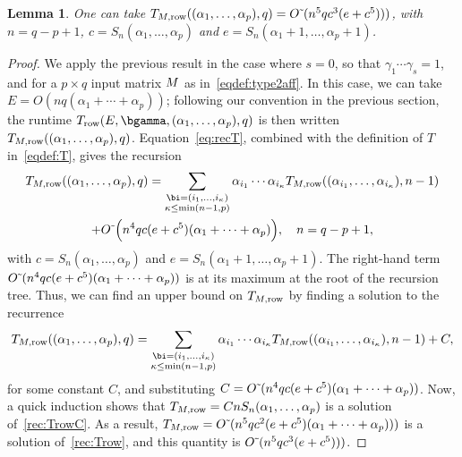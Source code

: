 \documentclass[12pt]{article}
\newtheorem{lemma}[definition]{Lemma}
\begin{document}
\begin{lemma}
  One can take $T_{M,{\rm row}}((\alpha_1,\dots,\alpha_p),q)= {O}{\,\tilde{ }\,}( n^5 q c^3(e+c^5 )))$, with
  $n=q-p+1$,
  $c=S_{n}(\alpha_1,\dots,\alpha_p)$ and
  $e=S_{n}(\alpha_1+1,\dots,\alpha_p+1)$.
\end{lemma}
\begin{proof}
  We apply the previous result in the case where $s=0$, so that
  $\gamma_1 \cdots \gamma_s=1$, and for a $p \times q$ input matrix
  ${M}$ as in~\eqref{eqdef:type2aff}. In this case, we can take
  $E=O(nq(\alpha_1 + \cdots + \alpha_p))$; following our convention in
  the previous section, the runtime $T_{\rm row}(E,\bgamma,(\alpha_1,\dots,\alpha_p),q)$
  is then written $T_{M,{\rm row}}((\alpha_1,\dots,\alpha_p),q)$.  Equation~\eqref{eq:recT},
  combined with the definition of $T$ in~\eqref{eqdef:T}, gives the 
  recursion
  \begin{multline}
  T_{M,{\rm row}}((\alpha_1,\dots,\alpha_p),q)=
\sum_{\substack{\bi=(i_1,\dots,i_\kappa)\\ \kappa\le\min(n-1,p)}}
\alpha_{i_1} \cdots \alpha_{i_\kappa} T_{M,{\rm row}}((\alpha_{i_1},\dots,\alpha_{i_\kappa}), n-1)
\\ + \softO\Big(  
  n^4 q c(e+c^5 )(\alpha_1 + \cdots + \alpha_p)\Big), \quad n=q-p+1,\label{rec:Trow}
  \end{multline}
  with $c=S_n(\alpha_1,\dots,\alpha_p)$ and
  $e=S_n(\alpha_1+1,\dots,\alpha_p+1)$.  The right-hand term ${O}{\,\tilde{ }\,}(
  n^4 q c(e+c^5 )(\alpha_1 + \cdots + \alpha_p))$ is at its maximum at
  the root of the recursion tree.  Thus, we can find an upper bound on
  $T_{M,{\rm row}}$ by finding a solution to the recurrence
  \begin{align}\label{rec:TrowC}
  T_{M,{\rm row}}((\alpha_1,\dots,\alpha_p),q)=
\sum_{\substack{\bi=(i_1,\dots,i_\kappa)\\ \kappa\le\min(n-1,p)}}
\alpha_{i_1} \cdots \alpha_{i_\kappa} T_{M,{\rm row}}((\alpha_{i_1},\dots,\alpha_{i_\kappa}), n-1)
+ C,
  \end{align}
  for some constant $C$, and substituting $C={O}{\,\tilde{ }\,}( n^4 q c(e+c^5
  )(\alpha_1 + \cdots + \alpha_p))$.  Now, a quick induction shows
  that $T_{M,{\rm row}}= C n S_n(\alpha_1,\dots,\alpha_p)$ is a
  solution of~\eqref{rec:TrowC}. As a result,
   $T_{M,{\rm row}}= {O}{\,\tilde{ }\,}( n^5 q c^2(e+c^5 )(\alpha_1 + \cdots + \alpha_p)))$
  is a solution of~\eqref{rec:Trow},
  and this quantity is $ {O}{\,\tilde{ }\,}( n^5 q c^3(e+c^5 )))$.
\end{proof}
\end{document}
